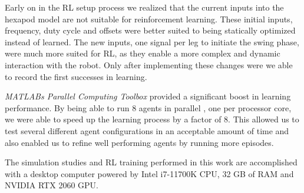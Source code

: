 Early on in the RL setup process we realized that the current inputs into the hexapod model are not suitable for reinforcement learning.
These initial inputs, frequency, duty cycle and offsets were better suited to being statically optimized instead of learned.
The new inputs, one signal per leg to initiate the swing phase, were much more suited for RL, as they enable a more complex and dynamic interaction with the robot.
Only after implementing these changes were we able to record the first successes in learning.


\textit{MATLABs Parallel Computing Toolbox} provided a significant boost in learning performance.
By being able to run 8 agents in parallel , one per processor core, we were able to speed up the learning process by a factor of 8.
This allowed us to test several different agent configurations in an acceptable amount of time and also enabled us to refine well performing agents by running more episodes.

The simulation studies and RL training performed in this work are accomplished with a desktop computer powered by Intel i7-11700K CPU, 32 GB of RAM and NVIDIA RTX 2060 GPU.



